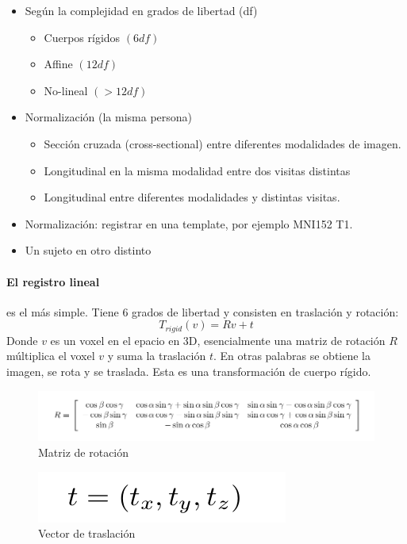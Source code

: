 \begin{itemize}
	\item Según la complejidad en grados de libertad (df)
	\begin{itemize}
		\item Cuerpos rígidos $(6 df)$
		\item Affine $(12 df)$
		\item No-lineal $(>12 df)$
	\end{itemize}
	\item Normalización (la misma persona)
	\begin{itemize}
		\item Sección cruzada (cross-sectional) entre diferentes modalidades de imagen.
		\item Longitudinal en la misma modalidad entre dos visitas distintas
		\item Longitudinal entre diferentes modalidades y distintas visitas.
	\end{itemize}
	\item Normalización: registrar en una template, por ejemplo MNI152 T1.
	\item Un sujeto en otro distinto
\end{itemize}

\paragraph{El registro lineal} es el más simple. Tiene 6 grados de libertad y consisten en traslación y rotación: $$T_{rigid}(v) = Rv + t$$
Donde $v$ es un voxel en el epacio en 3D, esencialmente una matriz de rotación $R$ múltiplica el voxel $v$ y suma la traslación $t$. En otras palabras se obtiene la imagen, se rota y se traslada. Esta es una transformación de cuerpo rígido.

\begin{figure}[H]
  \centering
    \includegraphics[scale=0.5]{img/rotation.png}
  \caption{Matriz de rotación}         \label{preproc:matriz_rot}
\end{figure}

\begin{figure}[H]
  \centering
    \includegraphics[scale=0.5]{img/tras_vec.png}
  \caption{Vector de traslación}         \label{preproc:tras_vec}
\end{figure}

